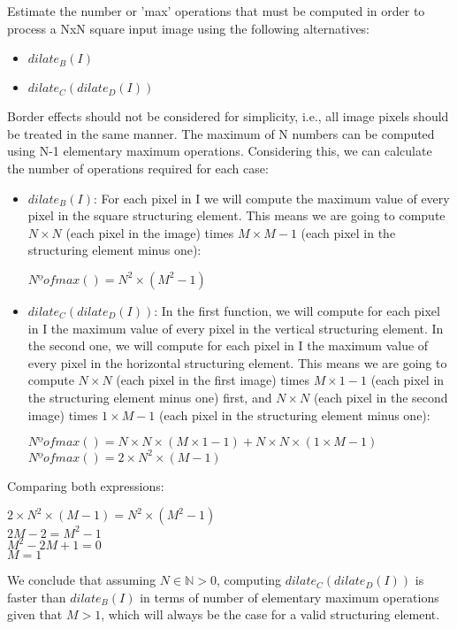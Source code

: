 \documentclass[12pt]{article}
\begin{document}
Estimate the number or 'max' operations that must be computed in order to process a NxN square input image using the following alternatives:
\begin{itemize}
  \item $dilate_B (I)$
  \item $dilate_C(dilate_D (I))$
\end{itemize}
Border effects should not be considered for simplicity, i.e., all image pixels should be treated in the same manner.
\newpage
The maximum of N numbers can be computed using N-1 elementary maximum operations. Considering this, we can calculate the number of operations required for each case:
\begin{itemize}
  \item $dilate_B (I)$: For each pixel in I we will compute the maximum value of every pixel in the square structuring element. This means we are going to compute $N \times N$ (each pixel in the image) times $M \times M - 1$ (each pixel in the structuring element minus one):
        \begin{center}
        $Nº of max() = N ^ 2 \times (M ^ 2 - 1)$
        \end{center}
  \item $dilate_C(dilate_D (I))$: In the first function, we will compute for each pixel in I the maximum value of every pixel in the vertical structuring element. In the second one, we will compute for each pixel in I the maximum value of every pixel in the horizontal structuring element. This means we are going to compute $N \times N$ (each pixel in the first image) times $M \times 1 - 1$ (each pixel in the structuring element minus one) first, and $N \times N$ (each pixel in the second image) times $1 \times M - 1$ (each pixel in the structuring element minus one):
        \begin{center}
        $Nº of max() = N \times N \times (M \times 1 - 1) + N \times N \times (1 \times M - 1)$ \\
        $Nº of max() = 2 \times N ^ 2 \times (M - 1)$
        \end{center}
\end{itemize}
Comparing both expressions:
        \begin{center}
        $2 \times N ^ 2 \times (M - 1) = N ^ 2 \times (M ^ 2 - 1)$ \\
        $2  M - 2 = M ^ 2 - 1$ \\
        $M ^ 2 - 2  M + 1 = 0$ \\
        $M  = 1$
        \end{center}
        
We conclude that assuming $N \in \mathbb{N} > 0$, computing $dilate_C(dilate_D (I))$ is faster than $dilate_B (I)$ in terms of number of elementary maximum operations given that $M > 1$, which will always be the case for a valid structuring element.
\end{document}
